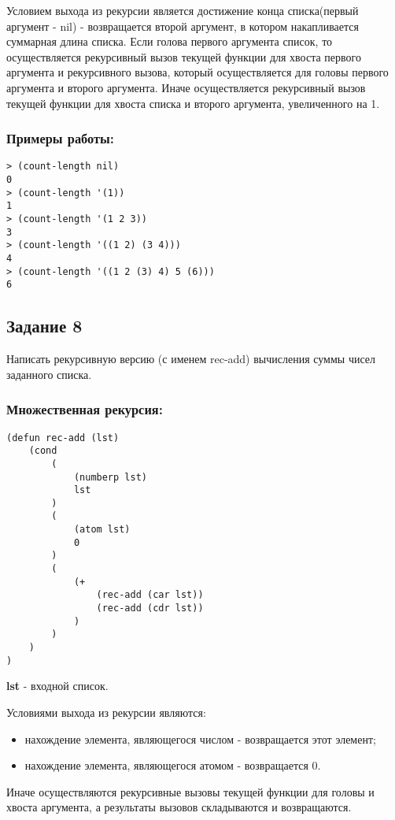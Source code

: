 \documentclass[a4paper,12pt]{article}
\begin{document}
Условием выхода из рекурсии является достижение конца списка(первый аргумент - nil) - возвращается второй аргумент, в котором накапливается суммарная длина списка. Если голова первого аргумента список, то осуществляется рекурсивный вызов текущей функции для хвоста первого аргумента и рекурсивного вызова, который осуществляется для головы первого аргумента и второго аргумента. Иначе осуществляется рекурсивный вызов текущей функции для хвоста списка и второго аргумента, увеличенного на 1.

\subsubsection*{Примеры работы:}
\begin{lstlisting}
> (count-length nil)
0
> (count-length '(1))
1
> (count-length '(1 2 3))
3
> (count-length '((1 2) (3 4)))
4
> (count-length '((1 2 (3) 4) 5 (6)))
6
\end{lstlisting}

\subsection*{Задание 8}

Написать рекурсивную версию (с именем rec-add) вычисления суммы чисел заданного списка.

\newpage

\subsubsection*{Множественная рекурсия:}
\begin{lstlisting}[caption=Функция вычисления суммы чисел списка]
(defun rec-add (lst)
	(cond
		(
			(numberp lst)
			lst
		)
		(
			(atom lst)
			0
		)
		(
			(+ 
				(rec-add (car lst))
				(rec-add (cdr lst))
			)
		)
	)
)
\end{lstlisting}
\textbf{lst} - входной список.

Условиями выхода из рекурсии являются:
\begin{itemize}
	\item нахождение элемента, являющегося числом - возвращается этот элемент;
	\item нахождение элемента, являющегося атомом - возвращается 0. 
\end{itemize}
Иначе осуществляются рекурсивные вызовы текущей функции для головы и хвоста аргумента, а результаты вызовов складываются и возвращаются.
\end{document}
